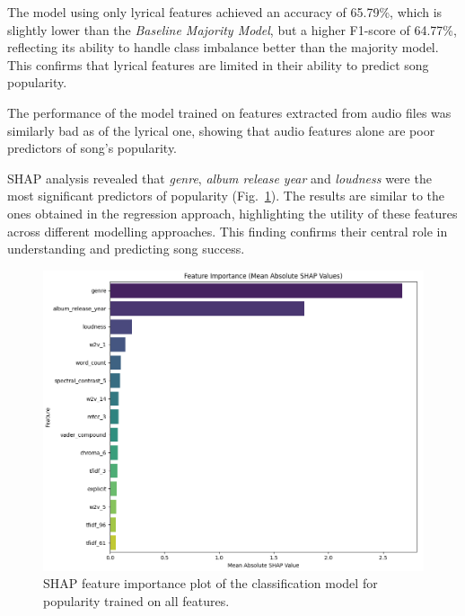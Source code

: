 The model using only lyrical features achieved an accuracy of 65.79\%, which is
slightly lower than the \textit{Baseline Majority Model}, but a higher F1-score
of 64.77\%, reflecting its ability to handle class imbalance better than the
majority model. This confirms that lyrical features are limited in their
ability to predict song popularity.


The performance of the model trained on features extracted from audio files was
similarly bad as of the lyrical one, showing that audio features alone are 
poor predictors of song's popularity.


SHAP analysis revealed that \textit{genre}, \textit{album release year} and
\textit{loudness} were the most significant predictors of
popularity (Fig.~\ref{Figure:feature_importance_popularity_clf}). The results are
similar to the ones obtained in the regression approach, highlighting the
utility of  these features across different modelling approaches. This finding
confirms their central role in understanding and predicting song success.

\begin{center}
\begin{figure}[H]
  \centering
  \includegraphics[width=6in]{img/feature_importance_popularity_clf.png}
  \caption{SHAP feature importance plot of the classification model for popularity trained on all features.}
  \label{Figure:feature_importance_popularity_clf}
\end{figure}
\end{center}

